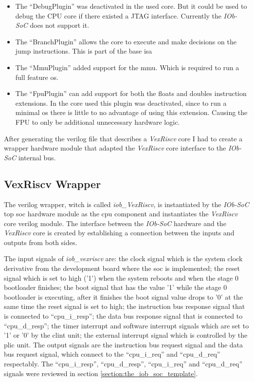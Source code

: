 \begin{itemize}
  \item The \enquote{DebugPlugin} was deactivated in the used core. But it could be used to debug the CPU core if there existed a JTAG interface. Currently the \textit{IOb-SoC} does not support it.
  \item The \enquote{BranchPlugin} allows the core to execute and make decisions on the jump instructions. This is part of the base \acrfull{isa}
  \item The \enquote{MmuPlugin} added support for the \acrfull{mmu}. Which is required to run a full feature \acrshort{os}.
  \item The \enquote{FpuPlugin} can add support for both the floats and doubles instruction extensions. In the core used this plugin was deactivated, since to run a minimal \acrshort{os} there is little to no advantage of using this extension. Causing the FPU to only be additional unnecessary hardware logic.
\end{itemize}

After generating the verilog file that describes a \textit{VexRiscv} core I had to create a wrapper hardware module that adapted the \textit{VexRiscv} core interface to the \textit{IOb-SoC} internal bus.

\subsection{VexRiscv Wrapper}
The verilog wrapper, witch is called \textit{iob\_VexRiscv}, is instantiated by the \textit{IOb-SoC} top \acrshort{soc} hardware module as the \acrshort{cpu} component and instantiates the \textit{VexRiscv} core verilog module. The interface between the \textit{IOb-SoC} hardware and the \textit{VexRiscv} core is created by establishing a connection between the inputs and outputs from both sides.

The input signals of \textit{iob\_vexriscv} are: the clock signal which is the system clock derivative from the development board where the \acrshort{soc} is implemented; the reset signal which is set to high ('1') when the system reboots and when the stage 0 bootloader finishes; the boot signal that has the value '1' while the stage 0 bootloader is executing, after it finishes the boot signal value drops to '0' at the same time the reset signal is set to high; the instruction bus response signal that is connected to \enquote{cpu\_i\_resp}; the data bus response signal that is connected to \enquote{cpu\_d\_resp}; the timer interrupt and software interrupt signals which are set to '1' or '0' by the \acrshort{clint} unit; the external interrupt signal which is controlled by the \acrshort{plic} unit. The output signals are the instruction bus request signal and the data bus request signal, which connect to the \enquote{cpu\_i\_req} and \enquote{cpu\_d\_req} respectably. The \enquote{cpu\_i\_resp}, \enquote{cpu\_d\_resp}, \enquote{cpu\_i\_req} and \enquote{cpu\_d\_req} signals were reviewed in section \ref{section:the_iob_soc_template}. 

